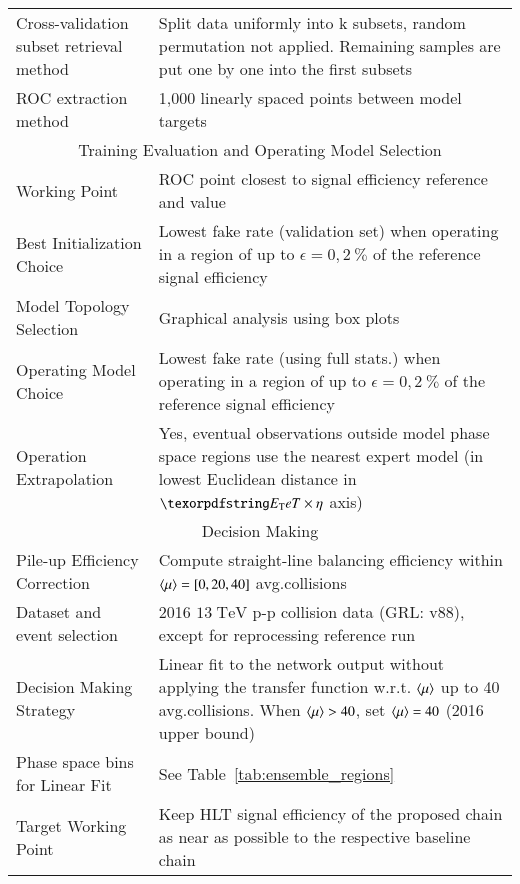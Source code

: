 \begin{table}[ht!]
{\begin{tabular}{p{6cm}p{10cm}}
Cross-validation subset retrieval method & Split data uniformly into k subsets,
random permutation not applied. Remaining samples are put one by one into the
first subsets \\
ROC extraction method & 1,000 linearly spaced points between model targets \\
\hline
\hline
\multicolumn{2}{c}{Training Evaluation and Operating Model Selection } \\
\hline
\hline

Working Point & ROC point closest to signal efficiency reference and \spmax{}
value \\

Best Initialization Choice & Lowest fake rate (validation set) when operating in
a region of up to $\epsilon=0,2~\%$ of the reference signal efficiency \\

Model Topology Selection & Graphical analysis using box plots \\

Operating Model Choice & Lowest fake rate (using full stats.) when operating in
a region of up to $\epsilon=0,2~\%$ of the reference signal efficiency \\

Operation Extrapolation & Yes, eventual observations outside model phase
space regions use the nearest expert model (in lowest Euclidean
distance in $\et\times\eta$ axis) \\

\hline
\hline
\multicolumn{2}{c}{Decision Making} \\
\hline
\hline

Pile-up Efficiency Correction & Compute straight-line balancing efficiency within
$\langle \mu \rangle=[0,20,40]$ avg.\@ collisions \\
Dataset and event selection & 2016 $13\;\text{TeV}$ p-p collision data
(GRL: v88), except for reprocessing reference run \\
Decision Making Strategy & Linear fit to the network output without applying the
transfer function w.r.t. $\langle \mu \rangle$ up to 40$\;$avg.\@ collisions.
When $\langle \mu \rangle>40$, set $\langle \mu \rangle = 40$ (2016 upper bound) \\

Phase space bins for Linear Fit & See
Table~\ref{tab:ensemble_regions}\\
Target Working Point & Keep HLT signal efficiency of the proposed chain as near as possible to the respective baseline chain \\
\hline
\hline
\hline
\end{tabular}
}
\end{table}


